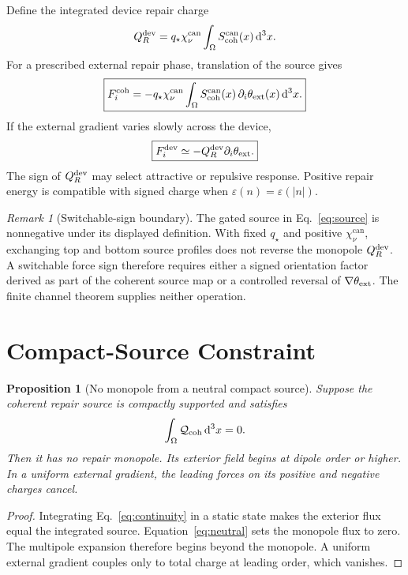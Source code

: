 \documentclass[11pt]{article}
\numberwithin{equation}{section}
\newtheorem{proposition}[theorem]{Proposition}
\theoremstyle{remark}
\newtheorem{remark}[theorem]{Remark}
\newcommand{\chican}{\chi_\nu^{\mathrm{can}}}
\newcommand{\scohcan}{S_{\mathrm{coh}}^{\mathrm{can}}}
\newcommand{\dd}{\,\mathrm d}
\begin{document}
Define the integrated device repair charge
\begin{equation}
Q_R^{\rm dev}=q_\star\chican
\int_\Omega\scohcan(x)\dd^3x.
\label{eq:device-charge}
\end{equation}
For a prescribed external repair phase, translation of the source gives
\begin{equation}
\boxed{
F_i^{\rm coh}=-q_\star\chican
\int_\Omega\scohcan(x)\,
\partial_i\theta_{\rm ext}(x)\dd^3x.}
\label{eq:force}
\end{equation}
If the external gradient varies slowly across the device,
\begin{equation}
\boxed{F_i^{\rm dev}\simeq
-Q_R^{\rm dev}\partial_i\theta_{\rm ext}.}
\label{eq:slow-force}
\end{equation}
The sign of \(Q_R^{\rm dev}\) may select attractive or repulsive response.
Positive repair energy is compatible with signed charge when
\(\varepsilon(n)=\varepsilon(|n|)\).

\begin{remark}[Switchable-sign boundary]
\label{rem:switchable-sign}
The gated source in Eq.~\eqref{eq:source} is nonnegative under its displayed
definition. With fixed \(q_\star\) and positive \(\chican\), exchanging top and
bottom source profiles does not reverse the monopole
\(Q_R^{\rm dev}\). A switchable force sign therefore requires either a signed
orientation factor derived as part of the coherent source map or a controlled
reversal of \(\nabla\theta_{\rm ext}\). The finite channel theorem supplies
neither operation.
\end{remark}

\section{Compact-Source Constraint}

\begin{proposition}[No monopole from a neutral compact source]
Suppose the coherent repair source is compactly supported and satisfies
\begin{equation}
\int_\Omega\mathcal Q_{\rm coh}\dd^3x=0.
\label{eq:neutral}
\end{equation}
Then it has no repair monopole. Its exterior field begins at dipole order or
higher. In a uniform external gradient, the leading forces on its positive and
negative charges cancel.
\end{proposition}

\begin{proof}
Integrating Eq.~\eqref{eq:continuity} in a static state makes the exterior
flux equal the integrated source. Equation~\eqref{eq:neutral} sets the
monopole flux to zero. The multipole expansion therefore begins beyond the
monopole. A uniform external gradient couples only to total charge at leading
order, which vanishes.
\end{proof}
\end{document}
